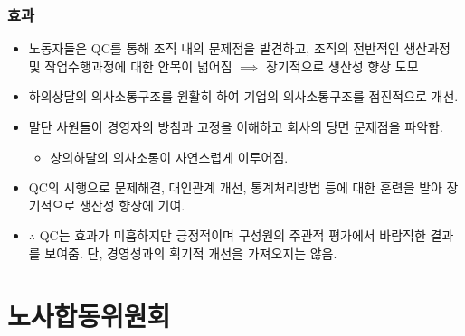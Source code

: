 \documentclass[aspectratio=169,xcolor=dvipsnames,handout]{beamer}
\begin{document}
\begin{frame}
    \frametitle{효과}
    \begin{itemize}[<+->]
        \item 노동자들은 QC를 통해 조직 내의 문제점을 발견하고, 조직의 전반적인 생산과정 및 작업수행과정에 대한 안목이 넓어짐 $\implies$ 장기적으로 생산성 향상 도모
        \item 하의상달의 의사소통구조를 원활히 하여 기업의 의사소통구조를 점진적으로 개선.
        \item 말단 사원들이 경영자의 방침과 고정을 이해하고 회사의 당면 문제점을 파악함.
        \begin{itemize}[<+->]
            \item 상의하달의 의사소통이 자연스럽게 이루어짐.
        \end{itemize}
        \item QC의 시행으로 문제해결, 대인관계 개선, 통계처리방법 등에 대한 훈련을 받아 장기적으로 생산성 향상에 기여.
        \item $\therefore$ QC는 효과가 미흡하지만 긍정적이며 구성원의 주관적 평가에서 바람직한 결과를 보여줌. 단, 경영성과의 획기적 개선을 가져오지는 않음.
    \end{itemize}
\end{frame}

\section{노사합동위원회}%
\end{document}
